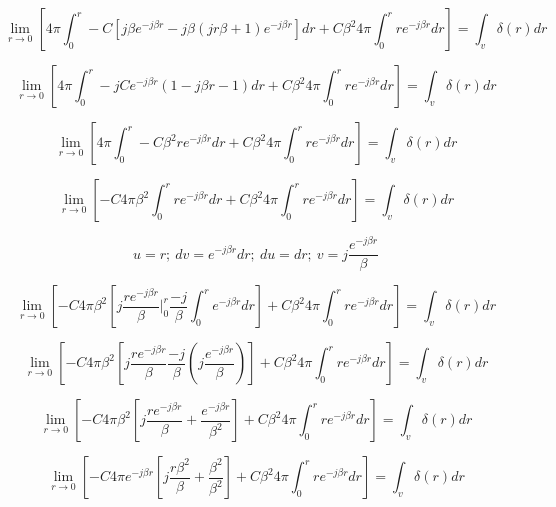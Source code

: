 	\begin{dmath*}
		\lim\limits_{r\rightarrow0} \left[4\pi\int_{0}^{r}-C[j\beta e^{-j\beta r}-j\beta(jr\beta+1)e^{-j\beta r}]dr + C\beta^{2}4\pi\int_{0}^{r}re^{-j\beta r}dr\right] = \int_{v}\delta(r)dr
	\end{dmath*}

	\begin{dmath*}
		\lim\limits_{r\rightarrow0} \left[4\pi\int_{0}^{r}-jCe^{-j\beta r}(1-j\beta r-1)dr + C\beta^{2}4\pi\int_{0}^{r}re^{-j\beta r}dr\right] = \int_{v}\delta(r)dr
	\end{dmath*}
	
	\begin{dmath*}
		\lim\limits_{r\rightarrow0} \left[4\pi\int_{0}^{r}-C\beta^{2}re^{-j\beta r}dr + C\beta^{2}4\pi\int_{0}^{r}re^{-j\beta r}dr\right] = \int_{v}\delta(r)dr
	\end{dmath*}
	
	\begin{dmath*}
		\lim\limits_{r\rightarrow0} \left[-C4\pi\beta^{2}\int_{0}^{r}re^{-j\beta r}dr + C\beta^{2}4\pi\int_{0}^{r}re^{-j\beta r}dr\right] = \int_{v}\delta(r)dr
	\end{dmath*}
	
	$$u = r;\ dv=e^{-j\beta r}dr;\ du=dr;\ v=j\frac{e^{-j\beta r}}{\beta}$$

	\begin{dmath*}
		\lim\limits_{r\rightarrow0} \left[-C4\pi\beta^{2}\left[j\frac{re^{-j\beta r}}{\beta}\bigg\vert_{0}^{r}\frac{-j}{\beta}\int_{0}^{r}e^{-j\beta r}dr\right] + C\beta^{2}4\pi\int_{0}^{r}re^{-j\beta r}dr\right] = \int_{v}\delta(r)dr
	\end{dmath*}
	
	\begin{dmath*}
		\lim\limits_{r\rightarrow0} \left[-C4\pi\beta^{2}\left[j\frac{re^{-j\beta r}}{\beta}  \frac{-j}{\beta}\left(j\frac{e^{-j\beta r}}{\beta}\right)\right] + C\beta^{2}4\pi\int_{0}^{r}re^{-j\beta r}dr\right] = \int_{v}\delta(r)dr
	\end{dmath*}
	
	\begin{dmath*}
		\lim\limits_{r\rightarrow0} \left[-C4\pi\beta^{2}\left[j\frac{re^{-j\beta r}}{\beta}  +\frac{e^{-j\beta r}}{\beta^{2}}\right] + C\beta^{2}4\pi\int_{0}^{r}re^{-j\beta r}dr\right] = \int_{v}\delta(r)dr
	\end{dmath*}

	\begin{dmath*}
		\lim\limits_{r\rightarrow0} \left[-C4\pi e^{-j\beta r}\left[j\frac{r\beta^{2}}{\beta} +\frac{\beta^{2}}{\beta^{2}}\right] + C\beta^{2}4\pi\int_{0}^{r}re^{-j\beta r}dr\right] = \int_{v}\delta(r)dr
	\end{dmath*}
	
